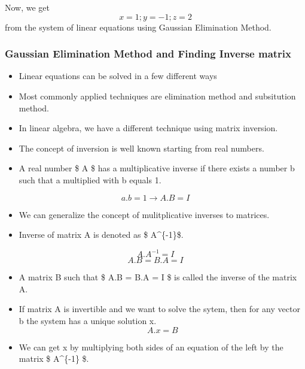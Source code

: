 \documentclass[11pt]{article}
\providecommand{\tightlist}{%
      \setlength{\itemsep}{0pt}\setlength{\parskip}{0pt}}
\begin{document}
    Now, we get \[ x = 1; y = -1; z = 2 \] from the system of linear
equations using Gaussian Elimination Method.

    \hypertarget{gaussian-elimination-method-and-finding-inverse-matrix}{%
\subsubsection{\texorpdfstring{\textbf{Gaussian Elimination Method and
Finding Inverse
matrix}}{Gaussian Elimination Method and Finding Inverse matrix}}\label{gaussian-elimination-method-and-finding-inverse-matrix}}

    \begin{itemize}
\tightlist
\item
  Linear equations can be solved in a few different ways
\item
  Most commonly applied techniques are elimination method and
  subsitution method.
\item
  In linear algebra, we have a different technique using matrix
  inversion.
\item
  The concept of inversion is well known starting from real numbers.
\end{itemize}

    \begin{itemize}
\tightlist
\item
  A real number \$ A \$ has a multiplicative inverse if there exists a
  number b such that a multiplied with b equals 1.
\end{itemize}

\[ a.b = 1 \rightarrow A.B = I \]

    \begin{itemize}
\tightlist
\item
  We can generalize the concept of mulitplicative inverses to matrices.
\item
  Inverse of matrix A is denoted as \$ A\^{}\{-1\}\$.
\end{itemize}

\[
    A.A^{-1} = I
\] \[
    A.B = B.A = I
\]

    \begin{itemize}
\tightlist
\item
  A matrix B such that \$ A.B = B.A = I \$ is called the inverse of the
  matrix A.
\item
  If matrix A is invertible and we want to solve the sytem, then for any
  vector b the system has a unique solution x. \[ 
  A.x = B
  \]
\item
  We can get x by multiplying both sides of an equation of the left by
  the matrix \$ A\^{}\{-1\} \$.
\end{itemize}
\end{document}

